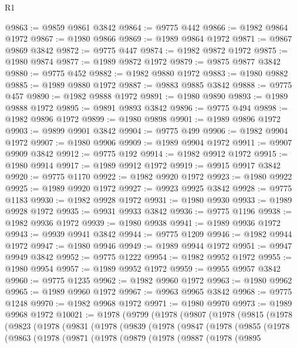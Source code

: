 \begin{lexlean}{R1}
\begin{coremodule}
@9863 := @9859 @9861 @3842
@9864 := @9775 @442
@9866 := @1982 @9864 @1972
@9867 := @1980 @9866
@9869 := @1989 @9864 @1972
@9871 := @9867 @9869 @3842
@9872 := @9775 @447
@9874 := @1982 @9872 @1972
@9875 := @1980 @9874
@9877 := @1989 @9872 @1972
@9879 := @9875 @9877 @3842
@9880 := @9775 @452
@9882 := @1982 @9880 @1972
@9883 := @1980 @9882
@9885 := @1989 @9880 @1972
@9887 := @9883 @9885 @3842
@9888 := @9775 @457
@9890 := @1982 @9888 @1972
@9891 := @1980 @9890
@9893 := @1989 @9888 @1972
@9895 := @9891 @9893 @3842
@9896 := @9775 @494
@9898 := @1982 @9896 @1972
@9899 := @1980 @9898
@9901 := @1989 @9896 @1972
@9903 := @9899 @9901 @3842
@9904 := @9775 @499
@9906 := @1982 @9904 @1972
@9907 := @1980 @9906
@9909 := @1989 @9904 @1972
@9911 := @9907 @9909 @3842
@9912 := @9775 @192
@9914 := @1982 @9912 @1972
@9915 := @1980 @9914
@9917 := @1989 @9912 @1972
@9919 := @9915 @9917 @3842
@9920 := @9775 @1170
@9922 := @1982 @9920 @1972
@9923 := @1980 @9922
@9925 := @1989 @9920 @1972
@9927 := @9923 @9925 @3842
@9928 := @9775 @1183
@9930 := @1982 @9928 @1972
@9931 := @1980 @9930
@9933 := @1989 @9928 @1972
@9935 := @9931 @9933 @3842
@9936 := @9775 @1196
@9938 := @1982 @9936 @1972
@9939 := @1980 @9938
@9941 := @1989 @9936 @1972
@9943 := @9939 @9941 @3842
@9944 := @9775 @1209
@9946 := @1982 @9944 @1972
@9947 := @1980 @9946
@9949 := @1989 @9944 @1972
@9951 := @9947 @9949 @3842
@9952 := @9775 @1222
@9954 := @1982 @9952 @1972
@9955 := @1980 @9954
@9957 := @1989 @9952 @1972
@9959 := @9955 @9957 @3842
@9960 := @9775 @1235
@9962 := @1982 @9960 @1972
@9963 := @1980 @9962
@9965 := @1989 @9960 @1972
@9967 := @9963 @9965 @3842
@9968 := @9775 @1248
@9970 := @1982 @9968 @1972
@9971 := @1980 @9970
@9973 := @1989 @9968 @1972
@10021 := @1978
    (@9799
      (@1978
        (@9807
          (@1978
            (@9815
              (@1978
                (@9823
                  (@1978
                    (@9831
                      (@1978
                        (@9839
                          (@1978
                            (@9847
                              (@1978
                                (@9855
                                  (@1978
                                    (@9863
                                      (@1978
                                        (@9871
                                          (@1978
                                            (@9879
                                              (@1978
                                                (@9887
                                                  (@1978
                                                    (@9895

\end{coremodule}
\end{lexlean}
